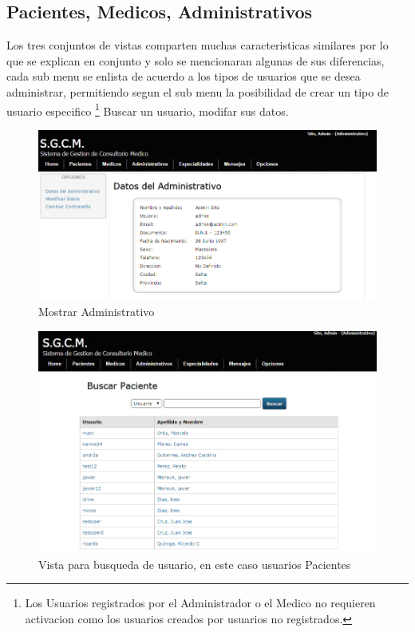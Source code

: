 \subsection{Pacientes, Medicos, Administrativos}

Los tres conjuntos de vistas comparten muchas caracteristicas similares por lo
que se explican en conjunto y solo se mencionaran algunas de sus diferencias,
cada sub menu se enlista de acuerdo a los tipos de usuarios que se desea
administrar, permitiendo segun el sub menu la posibilidad de crear un tipo de
usuario especifico \footnote{Los Usuarios registrados por el Administrador o el
Medico no requieren activacion como los usuarios creados por usuarios no
registrados.} Buscar un usuario, modifar sus datos.


\begin{figure}[H]
    \centering
    \includegraphics[scale=0.5]{resourse/datos-admin.png}
    \caption{Mostrar Administrativo}
    \label{fig:615}
\end{figure}

\begin{figure}[H]
    \centering
    \includegraphics[scale=0.5]{resourse/listado-paciente.png}
    \caption{Vista para busqueda de usuario, en este caso usuarios Pacientes}
    \label{fig:616}
\end{figure}

